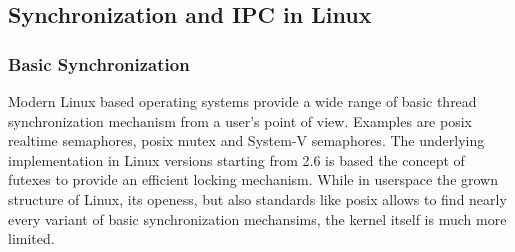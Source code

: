 %
%
%
%
%
%
%
%
%

\subsection{Synchronization and IPC in Linux}
\subsubsection*{Basic Synchronization}
Modern Linux based operating systems provide a wide range of basic thread synchronization mechanism from a user's point of view.
Examples are \ac{posix} realtime semaphores, \ac{posix} mutex and System-V semaphores\cite{glatz2015betriebssysteme}.
The underlying implementation in Linux versions starting from 2.6 is based the concept of futexes to provide an efficient locking mechanism\cite{tanenbaum-modern-operating-systems}.
While in userspace the grown structure of Linux, its openess, but also standards like \ac{posix} allows to find nearly every variant of basic synchronization mechansims, the kernel itself is much more limited.

